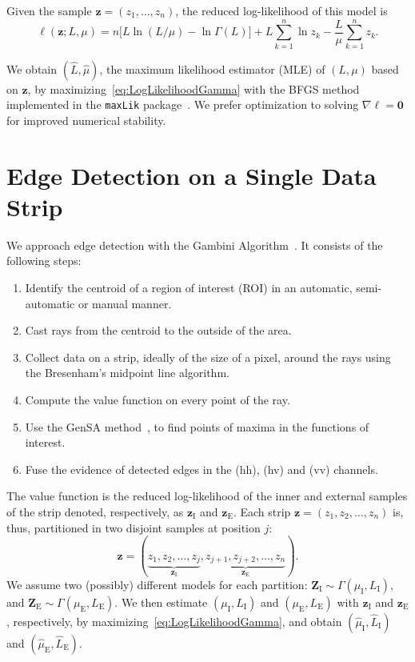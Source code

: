 \documentclass[journal]{IEEEtran}
\begin{document}
Given the sample $\bm z = (z_1,\dots,z_n)$,
the reduced log-likelihood of this model is
\begin{equation}
\ell(\bm z; L,\mu) = 
n \big[L\ln (L / \mu) - \ln \Gamma(L)\big]
+L \sum_{k=1}^{n}\ln z_k -\frac{L}{\mu}\sum_{k=1}^{n} z_k.
\label{eq:LogLikelihoodGamma}
\end{equation}

We obtain $(\widehat L, \widehat \mu)$, the maximum likelihood estimator (MLE) of $(L, \mu)$ based on $\bm z$, by maximizing~\eqref{eq:LogLikelihoodGamma} with the BFGS method implemented in the \texttt{maxLik} package~\cite{ht}.
We prefer optimization to solving $\nabla\ell=\bm 0$ for improved numerical stability.

\section{Edge Detection on a Single Data Strip}\label{sec_03}

We approach edge detection with the Gambini Algorithm~\cite{gmbf, fbgm, nhfc}.
It consists of the following steps:
\begin{enumerate}
	\item Identify the centroid of a region of interest (ROI) in an automatic, semi-automatic or manual manner.
	\item Cast rays from the centroid to the outside of the area.
	\item Collect data on a strip, ideally of the size of a pixel, around the rays using the  Bresenham's midpoint line algorithm.
	\item Compute the value function on every point of the ray.
	\item Use the GenSA method~\cite{xgsh}, to find points of maxima in the functions of interest.
	\item Fuse the evidence of detected edges in the (hh), (hv) and (vv) channels.
\end{enumerate}

The value function is the reduced log-likelihood of the inner and external samples of the strip denoted, respectively, as $\bm z_\text{I}$ and $\bm z_\text{E}$.
Each strip $\bm z = (z_1,z_2,\dots,z_n)$ is, thus, partitioned in two disjoint samples at position $j$:
$$
\bm z = (\underbrace{z_1,z_2,\dots,z_j}_{\bm z_\text{I}}, 
\underbrace{z_{j+1}, z_{j+2},\dots,z_n}_{\bm z_\text{E}}).
$$
We assume two (possibly) different models for each partition:
$\bm Z_\text{I} \sim \Gamma(\mu_\text{I},L_\text{I})$, and 
$\bm Z_\text{E} \sim \Gamma(\mu_\text{E},L_\text{E})$.
We then estimate $(\mu_\text{I},L_\text{I})$ and $(\mu_\text{E},L_\text{E})$ with $\bm z_\text{I}$ and $\bm z_\text{E}$, respectively, by maximizing~\eqref{eq:LogLikelihoodGamma}, and obtain $(\widehat{\mu}_\text{I}, \widehat{L}_\text{I})$ and $(\widehat{\mu}_\text{E}, \widehat{L}_\text{E})$.
\end{document}

